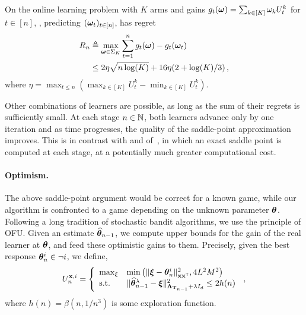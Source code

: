\begin{lemma}\label{lemma:lgc.adahedge}
\begin{leftbar}[lemmabar]
On the online learning problem with $K$ arms and gains $g_t({\boldsymbol \omega}) = \sum_{k\in[K]} \omega_k  U_t^k$ for $t\in[n]$, \AH, predicting $({\boldsymbol \omega}_t)_{t\in[n]}$, has regret
\begin{align*}
    R_n &\triangleq \max_{{\boldsymbol \omega}\in\Sigma_K}\sum_{t=1}^n g_t({\boldsymbol \omega}) - g_t({\boldsymbol \omega}_t) \\
    &\le 2\eta\sqrt{n\log(K)} + 16\eta(2+\log(K)/3) \,,
\end{align*}
where $\eta = \max_{t\le n}  (\max_{k\in[K]}U_t^{k}- \min_{k\in[K]}U_t^{k})$.
\end{leftbar}
\end{lemma}
Other combinations of learners are possible, as long as the sum of their regrets is sufficiently small. At each stage $n\in{\mathbb N}$, both learners advance only by one iteration and as time progresses, the quality of the saddle-point approximation improves. This is in contrast with \CT and \DT of~\cite{garivier2016tracknstop}, in which an exact saddle point is computed at each stage, at a potentially much greater computational cost.

\paragraph{Optimism.} The above saddle-point argument would be correct for a known game, while our algorithm is confronted to a game depending on the unknown parameter ${\boldsymbol \theta}$. Following a long tradition of stochastic bandit algorithms, we use the principle of OFU. Given an estimate $\widehat{{\boldsymbol \theta}}_{n-1}$, we compute upper bounds for the gain of the real learner at ${\boldsymbol \theta}$, and feed these optimistic gains to them. Precisely, given the best response ${\boldsymbol \theta}_n^i \in \neg i$, we define,
\begin{align*}
    U_n^{{\bf x},i} =\left\{
    \begin{array}{ll}
    \max_{\xi} & \min\big(\Vert {\boldsymbol \xi} - {\boldsymbol \theta}_n^i \Vert^2_{{\bf x}{\bf x}^\mathsf{\scriptscriptstyle T}},4L^2M^2\big)\\
    \text{s.t.} & \Vert \widehat{{\boldsymbol \theta}}_{n-1}^\lambda - {\boldsymbol \xi} \Vert^2_{{\boldsymbol \Lambda}_{{\bf T}_{n-1}}+\lambda I_d} \le 2h(n)
    \end{array}
    \right.\,,
\end{align*}
where $h(n)=\beta(n, 1/n^3)$ is some exploration function. 

